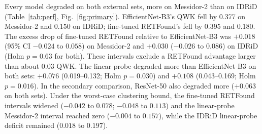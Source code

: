 \documentclass[pdflatex,sn-basic,Numbered]{sn-jnl}
\begin{document}
Every model degraded on both external sets, more on Messidor-2 than on IDRiD (Table~\ref{tab:perf}, Fig.~\ref{fig:primary}). EfficientNet-B3's QWK fell by 0.377 on Messidor-2 and 0.150 on IDRiD; fine-tuned RETFound's fell by 0.395 and 0.180. The excess drop of fine-tuned RETFound relative to EfficientNet-B3 was $+0.018$ (95\% CI $-0.024$ to $0.058$) on Messidor-2 and $+0.030$ ($-0.026$ to $0.086$) on IDRiD (Holm $p=0.63$ for both). These intervals exclude a RETFound advantage larger than about 0.03 QWK. The linear probe degraded more than EfficientNet-B3 on both sets: $+0.076$ (0.019--0.132; Holm $p=0.030$) and $+0.108$ (0.043--0.169; Holm $p=0.016$). In the secondary comparison, ResNet-50 also degraded more ($+0.063$ on both sets). Under the worst-case clustering bound, the fine-tuned RETFound intervals widened ($-0.042$ to $0.078$; $-0.048$ to $0.113$) and the linear-probe Messidor-2 interval reached zero ($-0.004$ to $0.157$), while the IDRiD linear-probe deficit remained ($0.018$ to $0.197$).
\end{document}
